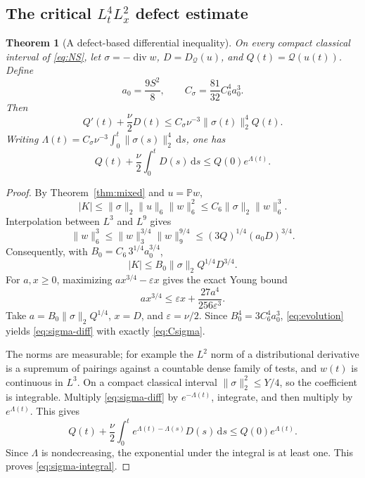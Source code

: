 \documentclass[11pt,a4paper]{article}
\newtheorem{theorem}{Theorem}[section]
\theoremstyle{definition}
\theoremstyle{remark}
\newcommand{\Q}{\mathcal Q}
\newcommand{\PP}{\mathbb P}
\newcommand{\dd}{\,\mathrm d}
\newcommand{\norm}[1]{\lVert #1\rVert}
\newcommand{\diver}{\operatorname{div}}
\numberwithin{equation}{section}
\begin{document}
\subsection{The critical \texorpdfstring{\(L^4_tL^2_x\)}{L4-in-time L2-in-space} defect estimate}
\begin{theorem}[A defect-based differential inequality]\label{thm:sigmacriterion}
On every compact classical interval of \eqref{eq:NS}, let
\(\sigma=-\diver w\), \(D=D_{\Q}(u)\), and \(Q(t)=\Q(u(t))\). Define
\begin{equation}\label{eq:Csigma}
a_0=\frac{9S^2}{8},\qquad
C_\sigma=\frac{81}{32}C_6^4a_0^3.
\end{equation}
Then
\begin{equation}\label{eq:sigma-diff}
Q'(t)+\frac\nu2D(t)
\le C_\sigma\nu^{-3}\norm{\sigma(t)}_2^4Q(t).
\end{equation}
Writing
\(\Lambda(t)=C_\sigma\nu^{-3}\int_0^t\norm{\sigma(s)}_2^4\dd s\), one has
\begin{equation}\label{eq:sigma-integral}
Q(t)+\frac\nu2\int_0^tD(s)\dd s\le Q(0)e^{\Lambda(t)}.
\end{equation}
\end{theorem}
\begin{proof}
By Theorem~\ref{thm:mixed} and \(u=\PP w\),
\[
|K|\le\norm\sigma_2\norm u_6\norm w_6^2
\le C_6\norm\sigma_2\norm w_6^3.
\]
Interpolation between \(L^3\) and \(L^9\) gives
\[
\norm w_6^3\le\norm w_3^{3/4}\norm w_9^{9/4}
\le (3Q)^{1/4}(a_0D)^{3/4}.
\]
Consequently, with \(B_0=C_6\,3^{1/4}a_0^{3/4}\),
\begin{equation}\label{eq:sigma-preyoung}
|K|\le B_0\norm\sigma_2 Q^{1/4}D^{3/4}.
\end{equation}
For \(a,x\ge0\), maximizing \(ax^{3/4}-\varepsilon x\) gives the exact Young bound
\[
ax^{3/4}\le\varepsilon x+\frac{27a^4}{256\varepsilon^3}.
\]
Take \(a=B_0\norm\sigma_2Q^{1/4}\), \(x=D\), and \(\varepsilon=\nu/2\). Since \(B_0^4=3C_6^4a_0^3\), \eqref{eq:evolution} yields \eqref{eq:sigma-diff} with exactly \eqref{eq:Csigma}.

The norms are measurable; for example the \(L^2\) norm of a distributional derivative is a supremum of pairings against a countable dense family of tests, and \(w(t)\) is continuous in \(L^3\). On a compact classical interval \(\norm\sigma_2^2\le Y/4\), so the coefficient is integrable. Multiply \eqref{eq:sigma-diff} by \(e^{-\Lambda(t)}\), integrate, and then multiply by \(e^{\Lambda(t)}\). This gives
\[
Q(t)+\frac\nu2\int_0^t e^{\Lambda(t)-\Lambda(s)}D(s)\dd s
\le Q(0)e^{\Lambda(t)}.
\]
Since \(\Lambda\) is nondecreasing, the exponential under the integral is at least one. This proves \eqref{eq:sigma-integral}.
\end{proof}
\end{document}
